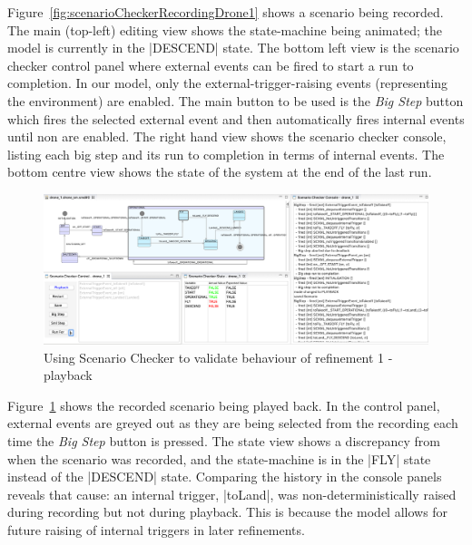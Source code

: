 Figure~\ref{fig:scenarioCheckerRecordingDrone1} shows a scenario being recorded.
The main (top-left) editing view shows the state-machine being animated; the model is currently in the |DESCEND| state.
The bottom left view is the scenario checker control panel where external events can be fired to start a run to completion.
In our model, only the external-trigger-raising events (representing the environment) are enabled.
The main button to be used is the \emph{Big Step} button which fires the selected external event and then automatically fires internal events until non are enabled.
The right hand view shows the scenario checker console, listing each big step and its run to completion in terms of internal events.
The bottom centre view shows the state of the system at the end of the last run.

\begin{figure}[!th]
	\centering
	\includegraphics[width=1.0\textwidth, trim=30 50 60 0]{figures/scenarioChecker_playback_drone1.png}
	\caption{Using Scenario Checker to validate behaviour of refinement 1 - playback }
	\label{fig:scenarioCheckerPlaybackDrone1}
\end{figure}

Figure~\ref{fig:scenarioCheckerPlaybackDrone1} shows the recorded scenario being played back.
In the control panel, external events are greyed out as they are being selected from the recording each time the \emph{Big Step} button is pressed. 
The state view shows a discrepancy from when the scenario was recorded, and the state-machine is in the |FLY| state instead of the |DESCEND| state.
Comparing the history in the console panels reveals that cause: an internal trigger, |toLand|, was non-deterministically raised during recording but not during playback.
This is because the model allows for future raising of internal triggers in later refinements.


